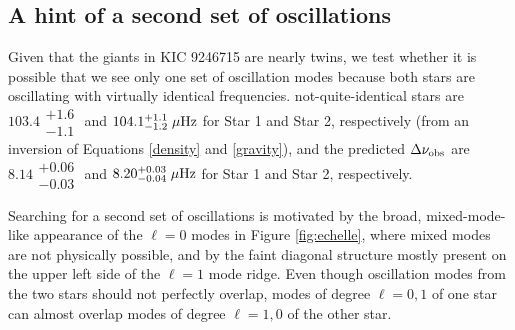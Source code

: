 \subsection{A hint of a second set of oscillations}
\label{subsec_second_osc}
Given that the giants in KIC 9246715 are nearly twins, we test whether it is possible that we see only one set of oscillation modes because both stars are oscillating with virtually identical frequencies.  not-quite-identical stars are
$103.4\substack{+1.6 \\ -1.1}$ and $104.1\substack{+1.1 \\ -1.2} \ \mu\rm{Hz}$ 
for Star 1 and Star 2, respectively (from an inversion of Equations \ref{density} and \ref{gravity}), and the predicted $\Delta\nu_{\rm{obs}}$ are 
$8.14\substack{+0.06 \\ -0.03}$ and $8.20\substack{+0.03 \\ -0.04} \ \mu\rm{Hz}$ 
for Star 1 and Star 2, respectively.

Searching for a second set of oscillations is motivated by the broad, mixed-mode-like appearance of the $\ell=0$ modes in Figure \ref{fig:echelle}, where mixed modes are not physically possible, and by the faint diagonal structure mostly present on the upper left side of the $\ell=1$ mode ridge. Even though oscillation modes from the two stars should not perfectly overlap, modes of degree $\ell=0,1$ of one star can almost overlap modes of degree $\ell=1,0$ of the other star.

